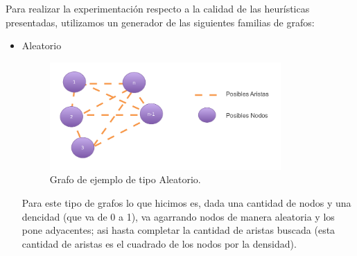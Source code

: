 
Para realizar la experimentación respecto a la calidad de las heurísticas presentadas, utilizamos un generador de las siguientes familias de grafos:
\begin{itemize}
\item Aleatorio
 \begin{figure}[H] %
\begin{center}
\includegraphics[width=250pt]{../imgs/aleatorio.png}
\caption{Grafo de ejemplo de tipo Aleatorio.}
\end{center}
\end{figure}
 Para este tipo de grafos lo que hicimos es, dada una cantidad de nodos y una dencidad (que va de 0 a 1), va agarrando nodos de manera aleatoria y los pone adyacentes; asi hasta completar la cantidad de aristas buscada (esta cantidad de aristas es el cuadrado de los nodos por la densidad).


\end{itemize}
